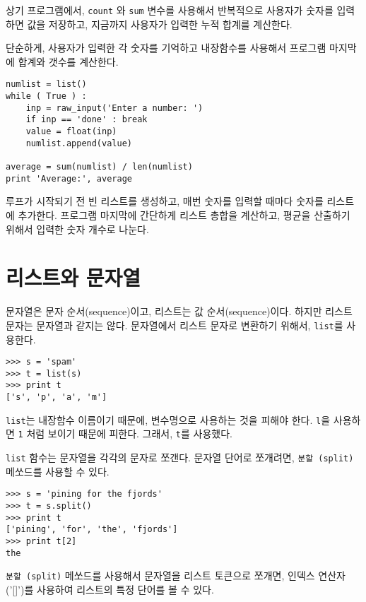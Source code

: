 상기 프로그램에서, {\tt count} 와 {\tt sum} 변수를 사용해서 반복적으로 사용자가 숫자를 입력하면 값을 저장하고, 
지금까지 사용자가 입력한 누적 합계를 계산한다.

단순하게, 사용자가 입력한 각 숫자를 기억하고 내장함수를 사용해서 프로그램 마지막에 합계와 갯수를 계산한다.

\beforeverb
\begin{verbatim}
numlist = list()
while ( True ) :
    inp = raw_input('Enter a number: ')
    if inp == 'done' : break
    value = float(inp)
    numlist.append(value)

average = sum(numlist) / len(numlist)
print 'Average:', average
\end{verbatim}
\afterverb
%

루프가 시작되기 전 빈 리스트를 생성하고, 매번 숫자를 입력할 때마다 숫자를 리스트에 추가한다.
프로그램 마지막에 간단하게 리스트 총합을 계산하고, 평균을 산출하기 위해서 입력한 숫자 개수로 나눈다.

\section{리스트와 문자열}


문자열은 문자 순서(sequence)이고, 리스트는 값 순서(sequence)이다. 
하지만 리스트 문자는 문자열과 같지는 않다. 
문자열에서 리스트 문자로 변환하기 위해서, {\tt list}를 사용한다.


\beforeverb
\begin{verbatim}
>>> s = 'spam'
>>> t = list(s)
>>> print t
['s', 'p', 'a', 'm']
\end{verbatim}
\afterverb
%

{\tt list}는 내장함수 이름이기 때문에, 변수명으로 사용하는 것을 피해야 한다.
{\tt l}을 사용하면 {\tt 1} 처럼 보이기 때문에 피한다. 그래서, {\tt t}를 사용했다.

{\tt list} 함수는 문자열을 각각의 문자로 쪼갠다. 
문자열 단어로 쪼개려면, {\tt 분할 (split)} 메쏘드를 사용할 수 있다.


\beforeverb
\begin{verbatim}
>>> s = 'pining for the fjords'
>>> t = s.split()
>>> print t
['pining', 'for', 'the', 'fjords']
>>> print t[2]
the
\end{verbatim}
\afterverb
%
{\tt 분할 (split)} 메쏘드를 사용해서 문자열을 리스트 토큰으로 쪼개면, 인덱스 연산자('[]')를 사용하여 리스트의 특정 단어를 볼 수 있다.

